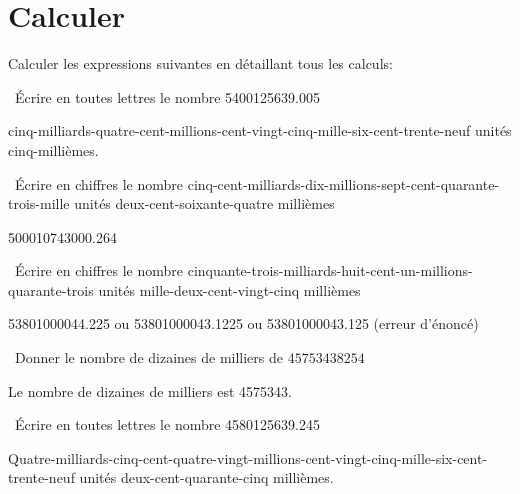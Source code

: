 
\section{Calculer}
Calculer les expressions suivantes en détaillant tous les calculs:
\begin{questions}
	
	\question[1]  \'Ecrire en toutes lettres le nombre \num{5400125639.005}
	
	\begin{solution}
		cinq-milliards-quatre-cent-millions-cent-vingt-cinq-mille-six-cent-trente-neuf unités cinq-millièmes.
	\end{solution}
	
	
	\question[1]  \'Ecrire en chiffres le nombre cinq-cent-milliards-dix-millions-sept-cent-quarante-trois-mille unités deux-cent-soixante-quatre millièmes
	
	\begin{solution}
		\num{500010743000.264}
	\end{solution}
	
	\question[1]  \'Ecrire en chiffres le nombre cinquante-trois-milliards-huit-cent-un-millions-quarante-trois unités mille-deux-cent-vingt-cinq millièmes
	
	\begin{solution}
		\num{53801000044,225} ou \num{53801000043,1225} ou \num{53801000043,125} (erreur d'énoncé)
	\end{solution}
	
	\question[1]  Donner le nombre de dizaines de milliers de $\num{45753438254}$
	
	\begin{solution}
		Le nombre de dizaines de milliers est \num{4575343}.
	\end{solution}
	
	\question[1]  \'Ecrire en toutes lettres le nombre \num{4580125639.245}
	
	
	\begin{solution}
		Quatre-milliards-cinq-cent-quatre-vingt-millions-cent-vingt-cinq-mille-six-cent-trente-neuf unités deux-cent-quarante-cinq millièmes.
	\end{solution}	
	
	
	\newpage
	

\end{questions}
